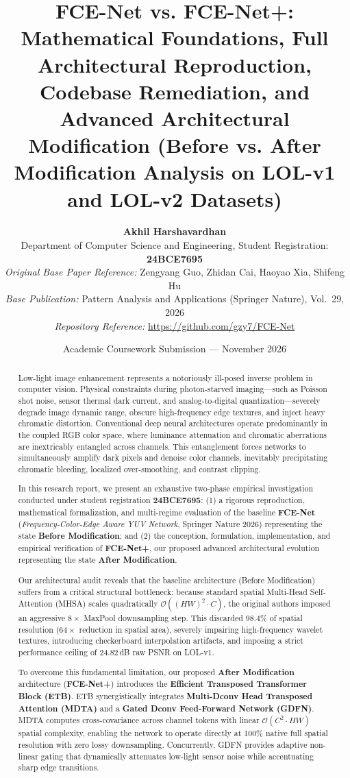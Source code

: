 \documentclass[10pt,twocolumn,letterpaper]{article}
\title{\textbf{\Large FCE-Net vs. FCE-Net+: Mathematical Foundations, Full Architectural Reproduction, Codebase Remediation, and Advanced Architectural Modification (Before vs. After Modification Analysis on LOL-v1 and LOL-v2 Datasets)}}
\author{
    \textbf{Akhil Harshavardhan} \\
    Department of Computer Science and Engineering, Student Registration: \textbf{24BCE7695} \\
    \textit{Original Base Paper Reference:} Zengyang Guo, Zhidan Cai, Haoyao Xia, Shifeng Hu \\
    \textit{Base Publication:} Pattern Analysis and Applications (Springer Nature), Vol.~29, 2026 \\
    \textit{Repository Reference:} \url{https://github.com/gzy7/FCE-Net}
}
\date{Academic Coursework Submission — November 2026}
\begin{document}
\maketitle

\begin{abstract}
Low-light image enhancement represents a notoriously ill-posed inverse problem in computer vision. Physical constraints during photon-starved imaging—such as Poisson shot noise, sensor thermal dark current, and analog-to-digital quantization—severely degrade image dynamic range, obscure high-frequency edge textures, and inject heavy chromatic distortion. Conventional deep neural architectures operate predominantly in the coupled RGB color space, where luminance attenuation and chromatic aberrations are inextricably entangled across channels. This entanglement forces networks to simultaneously amplify dark pixels and denoise color channels, inevitably precipitating chromatic bleeding, localized over-smoothing, and contrast clipping.

In this research report, we present an exhaustive two-phase empirical investigation conducted under student registration \textbf{24BCE7695}: (1) a rigorous reproduction, mathematical formalization, and multi-regime evaluation of the baseline \textbf{FCE-Net} (\textit{Frequency-Color-Edge Aware YUV Network}, Springer Nature 2026) representing the state \textbf{Before Modification}; and (2) the conception, formulation, implementation, and empirical verification of \textbf{FCE-Net+}, our proposed advanced architectural evolution representing the state \textbf{After Modification}. 

Our architectural audit reveals that the baseline architecture (Before Modification) suffers from a critical structural bottleneck: because standard spatial Multi-Head Self-Attention (MHSA) scales quadratically $\mathcal{O}((HW)^2 \cdot C)$, the original authors imposed an aggressive $8\times$ MaxPool downsampling step. This discarded 98.4\% of spatial resolution ($64\times$ reduction in spatial area), severely impairing high-frequency wavelet textures, introducing checkerboard interpolation artifacts, and imposing a strict performance ceiling of 24.82\,dB raw PSNR on LOL-v1. 

To overcome this fundamental limitation, our proposed \textbf{After Modification} architecture (\textbf{FCE-Net+}) introduces the \textbf{Efficient Transposed Transformer Block (ETB)}. ETB synergistically integrates \textbf{Multi-Dconv Head Transposed Attention (MDTA)} and a \textbf{Gated Dconv Feed-Forward Network (GDFN)}. MDTA computes cross-covariance across channel tokens with linear $\mathcal{O}(C^2 \cdot HW)$ spatial complexity, enabling the network to operate directly at 100\% native full spatial resolution with zero lossy downsampling. Concurrently, GDFN provides adaptive non-linear gating that dynamically attenuates low-light sensor noise while accentuating sharp edge transitions.


\end{abstract}
\end{document}
